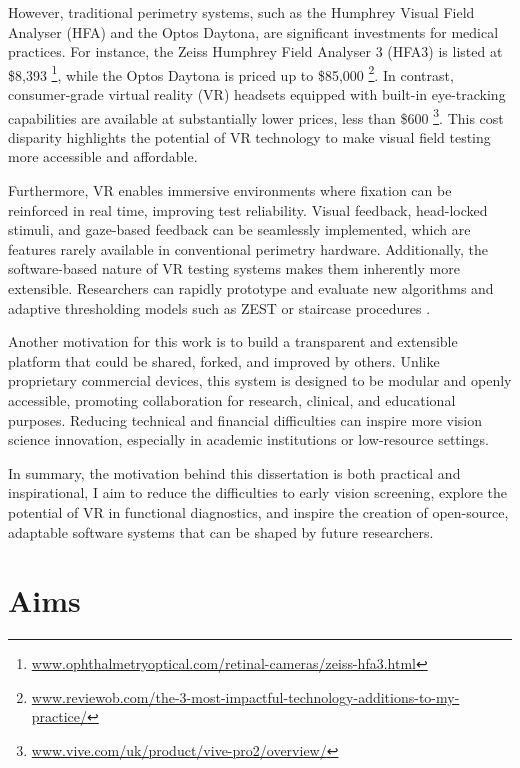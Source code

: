 \documentclass{l4proj}
\begin{document}
However, traditional perimetry systems, such as the Humphrey Visual Field Analyser (HFA) and the Optos Daytona, are significant investments for medical practices. For instance, the Zeiss Humphrey Field Analyser 3 (HFA3) is listed at \$8,393 \footnote{\href{www.ophthalmetryoptical.com/retinal-cameras/zeiss-hfa3.html}{www.ophthalmetryoptical.com/retinal-cameras/zeiss-hfa3.html}}, while the Optos Daytona is priced up to \$85,000 \footnote{\href{https://reviewob.com/the-3-most-impactful-technology-additions-to-my-practice/}{www.reviewob.com/the-3-most-impactful-technology-additions-to-my-practice/}}. In contrast, consumer-grade virtual reality (VR) headsets equipped with built-in eye-tracking capabilities are available at substantially lower prices, less than \$600 \footnote{\href{https://www.vive.com/uk/product/vive-pro2/overview/}{www.vive.com/uk/product/vive-pro2/overview/}}. This cost disparity highlights the potential of VR technology to make visual field testing more accessible and affordable.

Furthermore, VR enables immersive environments where fixation can be reinforced in real time, improving test reliability. Visual feedback, head-locked stimuli, and gaze-based feedback can be seamlessly implemented, which are features rarely available in conventional perimetry hardware. Additionally, the software-based nature of VR testing systems makes them inherently more extensible. Researchers can rapidly prototype and evaluate new algorithms and adaptive thresholding models such as ZEST or staircase procedures \citep{mot3} \citep{mot4}. 

Another motivation for this work is to build a transparent and extensible platform that could be shared, forked, and improved by others. Unlike proprietary commercial devices, this system is designed to be modular and openly accessible, promoting collaboration for research, clinical, and educational purposes. Reducing technical and financial difficulties can inspire more vision science innovation, especially in academic institutions or low-resource settings. 

In summary, the motivation behind this dissertation is both practical and inspirational, I aim to reduce the difficulties to early vision screening, explore the potential of VR in functional diagnostics, and inspire the creation of open-source, adaptable software systems that can be shaped by future researchers. 


\newpage
\section{Aims}
\end{document}
